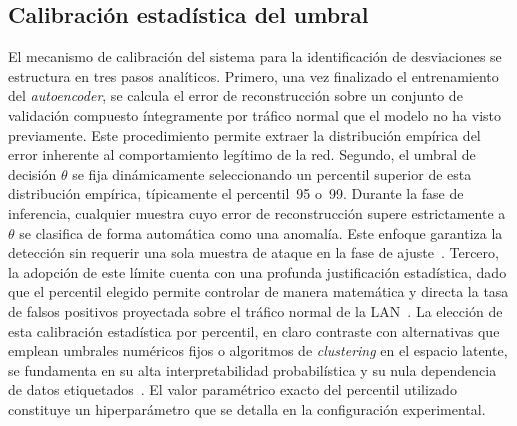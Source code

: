 \documentclass[conference]{IEEEtran}
\begin{document}
\subsection{Calibración estadística del umbral}
El mecanismo de calibración del sistema para la identificación de
desviaciones se estructura en tres pasos analíticos. Primero, una vez
finalizado el entrenamiento del \textit{autoencoder}, se calcula el
error de reconstrucción sobre un conjunto de validación compuesto
íntegramente por tráfico normal que el modelo no ha visto previamente.
Este procedimiento permite extraer la distribución empírica del error
inherente al comportamiento legítimo de la red. Segundo, el umbral de
decisión $\theta$ se fija dinámicamente seleccionando un percentil
superior de esta distribución empírica, típicamente el percentil~95
o~99. Durante la fase de inferencia, cualquier muestra cuyo error de
reconstrucción supere estrictamente a $\theta$ se clasifica de forma
automática como una anomalía. Este enfoque garantiza la detección sin
requerir una sola muestra de ataque en la fase de
ajuste~\cite{zavrak2020}. Tercero, la adopción de este límite cuenta con
una profunda justificación estadística, dado que el percentil elegido
permite controlar de manera matemática y directa la tasa de falsos
positivos proyectada sobre el tráfico normal de la LAN~\cite{zhang2023}.
La elección de esta calibración estadística por percentil, en claro
contraste con alternativas que emplean umbrales numéricos fijos o
algoritmos de \textit{clustering} en el espacio latente, se fundamenta
en su alta interpretabilidad probabilística y su nula dependencia de
datos etiquetados~\cite{maleki2021}. El valor paramétrico exacto del
percentil utilizado constituye un hiperparámetro que se detalla en la
configuración experimental.
\end{document}
